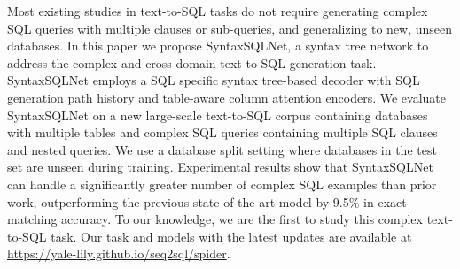 Most existing studies in text-to-SQL tasks do not require generating complex SQL queries with multiple clauses or sub-queries, and generalizing to new, unseen databases. In this paper we propose SyntaxSQLNet, a syntax tree network to address the complex and cross-domain text-to-SQL generation task. SyntaxSQLNet employs a SQL specific syntax tree-based decoder with SQL generation path history and table-aware column attention encoders. We evaluate SyntaxSQLNet on a new large-scale text-to-SQL corpus containing databases with multiple tables and complex SQL queries containing multiple SQL clauses and nested queries. We use a database split setting where databases in the test set are unseen during training. Experimental results show that SyntaxSQLNet can handle a significantly greater number of complex SQL examples than prior work, outperforming the previous state-of-the-art model by 9.5\% in exact matching accuracy. To our knowledge, we are the first to study this complex text-to-SQL task. Our task and models with the latest updates are available at \url{https://yale-lily.github.io/seq2sql/spider}.
